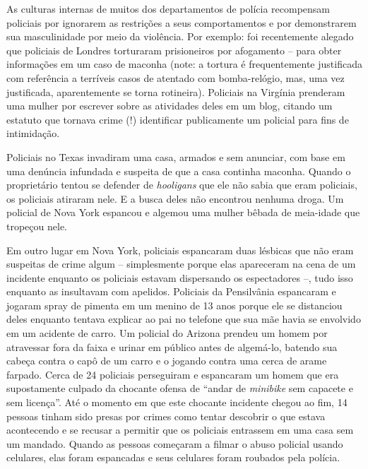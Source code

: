 As culturas internas de muitos dos departamentos de polícia recompensam policiais por ignorarem as restrições a seus comportamentos e por demonstrarem sua masculinidade por meio da violência. Por exemplo: foi recentemente alegado que policiais de Londres torturaram prisioneiros por afogamento -- para obter informações em um caso de maconha (note: a tortura é frequentemente justificada com referência a terríveis casos de atentado com bomba-relógio, mas, uma vez justificada, aparentemente se torna rotineira). Policiais na Virgínia prenderam uma mulher por escrever sobre as atividades deles em um blog, citando um estatuto que tornava crime (!) identificar publicamente um policial para fins de intimidação.

Policiais no Texas invadiram uma casa, armados e sem anunciar, com base em uma denúncia infundada e suspeita de que a casa continha maconha. Quando o proprietário tentou se defender de \emph{hooligans} que ele não sabia que eram policiais, os policiais atiraram nele. E a busca deles não encontrou nenhuma droga. Um policial de Nova York espancou e algemou uma mulher bêbada de meia-idade que tropeçou nele.

Em outro lugar em Nova York, policiais espancaram duas lésbicas que não eram suspeitas de crime algum -- simplesmente porque elas apareceram na cena de um incidente enquanto os policiais estavam dispersando os espectadores --, tudo isso enquanto as insultavam com apelidos. Policiais da Pensilvânia espancaram e jogaram spray de pimenta em um menino de 13 anos porque ele se distanciou deles enquanto tentava explicar ao pai no telefone que sua mãe havia se envolvido em um acidente de carro. Um policial do Arizona prendeu um homem por atravessar fora da faixa e urinar em público antes de algemá-lo, batendo sua cabeça contra o capô de um carro e o jogando contra uma cerca de arame farpado. Cerca de 24 policiais perseguiram e espancaram um homem que era supostamente culpado da chocante ofensa de ``andar de \emph{minibike} sem capacete e sem licença''. Até o momento em que este chocante incidente chegou ao fim, 14 pessoas tinham sido presas por crimes como tentar descobrir o que estava acontecendo e se recusar a permitir que os policiais entrassem em uma casa sem um mandado. Quando as pessoas começaram a filmar o abuso policial usando celulares, elas foram espancadas e seus celulares foram roubados pela polícia.


